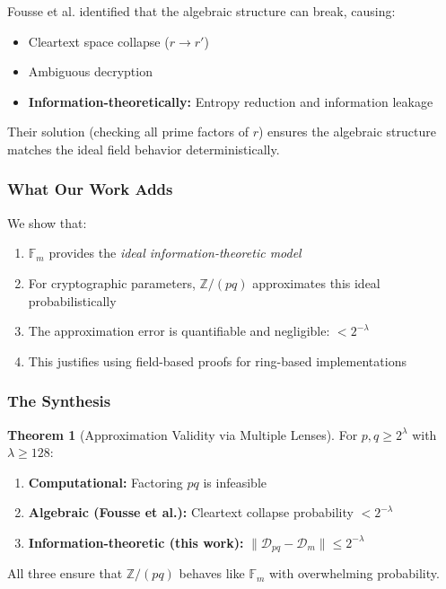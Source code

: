 \documentclass[11pt]{article}
\theoremstyle{definition}
\newtheorem{theorem}{Theorem}
\begin{document}
Fousse et al. identified that the algebraic structure can break, causing:
\begin{itemize}
\item Cleartext space collapse ($r \to r'$)
\item Ambiguous decryption
\item \textbf{Information-theoretically:} Entropy reduction and information leakage
\end{itemize}

Their solution (checking all prime factors of $r$) ensures the algebraic structure matches the ideal field behavior deterministically.

\subsubsection{What Our Work Adds}

We show that:
\begin{enumerate}
\item $\mathbb{F}_m$ provides the \emph{ideal information-theoretic model}
\item For cryptographic parameters, $\mathbb{Z}/(pq)$ approximates this ideal probabilistically
\item The approximation error is quantifiable and negligible: $< 2^{-\lambda}$
\item This justifies using field-based proofs for ring-based implementations
\end{enumerate}

\subsubsection{The Synthesis}

\begin{theorem}[Approximation Validity via Multiple Lenses]
For $p, q \geq 2^\lambda$ with $\lambda \geq 128$:

\begin{enumerate}
\item \textbf{Computational:} Factoring $pq$ is infeasible
\item \textbf{Algebraic (Fousse et al.):} Cleartext collapse probability $< 2^{-\lambda}$
\item \textbf{Information-theoretic (this work):} $\|\mathcal{D}_{pq} - \mathcal{D}_m\| \leq 2^{-\lambda}$
\end{enumerate}

All three ensure that $\mathbb{Z}/(pq)$ behaves like $\mathbb{F}_m$ with overwhelming probability.
\end{theorem}
\end{document}

